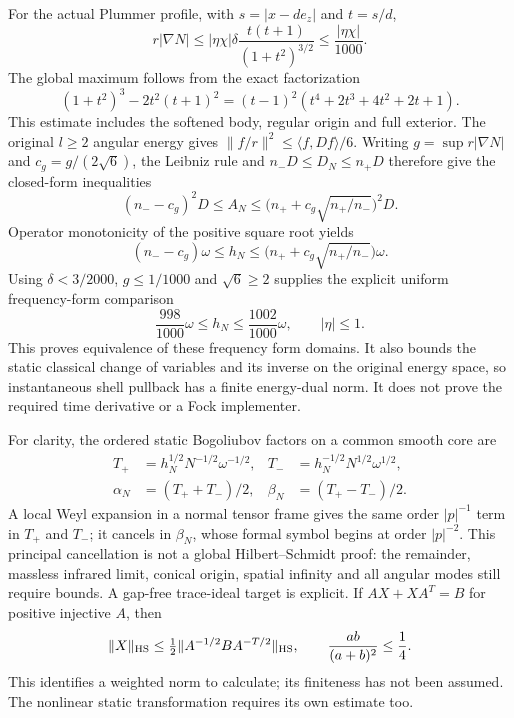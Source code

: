 For the actual Plummer profile, with $s=|x-de_z|$ and $t=s/d$,
\[
 r|\nabla N|\le |\eta\chi|\delta
       \frac{t(t+1)}{(1+t^2)^{3/2}}
       \le\frac{|\eta\chi|}{1000}.
\]
The global maximum follows from the exact factorization
\[
 (1+t^2)^3-2t^2(t+1)^2
 =(t-1)^2(t^4+2t^3+4t^2+2t+1).
\]
This estimate includes the softened body, regular origin and full exterior.
The original $l\ge2$ angular energy gives
$\|f/r\|^2\le\langle f,Df\rangle/6$.
Writing $g=\sup r|\nabla N|$ and $c_g=g/(2\sqrt6)$, the Leibniz rule and
$n_-D\le D_N\le n_+D$ therefore give the closed-form inequalities
\[
 (n_--c_g)^2D\le A_N
 \le\bigl(n_++c_g\sqrt{n_+/n_-}\bigr)^2D.
\]
Operator monotonicity of the positive square root yields
\[
 (n_--c_g)\omega\le h_N
 \le\bigl(n_++c_g\sqrt{n_+/n_-}\bigr)\omega.
\]
Using $\delta<3/2000$, $g\le1/1000$ and $\sqrt6\ge2$ supplies the explicit
uniform frequency-form comparison
\[
 \frac{998}{1000}\omega\le h_N\le\frac{1002}{1000}\omega,
 \qquad |\eta|\le1.
\]
This proves equivalence of these frequency form domains. It also bounds the
static classical change of variables and its inverse on the original energy
space, so instantaneous shell pullback has a finite energy-dual norm. It
does not prove the required time derivative or a Fock implementer.

For clarity, the ordered static Bogoliubov factors on a common smooth core
are
\[
 \begin{aligned}
 T_+&=h_N^{1/2}N^{-1/2}\omega^{-1/2},&
 T_-&=h_N^{-1/2}N^{1/2}\omega^{1/2},\\
 \alpha_N&=(T_++T_-)/2,& \beta_N&=(T_+-T_-)/2.
 \end{aligned}
\]
A local Weyl expansion in a normal tensor frame gives the same order
$|p|^{-1}$ term in $T_+$ and $T_-$; it cancels in $\beta_N$, whose formal
symbol begins at order $|p|^{-2}$. This principal cancellation is not a
global Hilbert--Schmidt proof: the remainder, massless infrared limit,
conical origin, spatial infinity and all angular modes still require
bounds. A gap-free trace-ideal target is explicit. If
$AX+XA^T=B$ for positive injective $A$, then
\[
 \|X\|_{\rm HS}\le\tfrac12
       \|A^{-1/2}BA^{-T/2}\|_{\rm HS},
 \qquad \frac{ab}{(a+b)^2}\le\frac14.
\]
This identifies a weighted norm to calculate; its finiteness has not been
assumed. The nonlinear static transformation requires its own estimate too.

